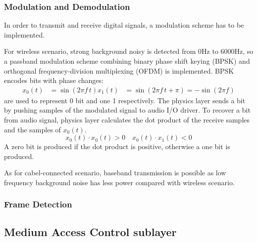 \subsubsection{Modulation and Demodulation}
In order to transmit and receive digital signals, a modulation scheme has to be implemented.
\par
For wireless scenario, strong background noisy is detected from 0Hz to 6000Hz,
so a passband modulation scheme
combining binary phase shift keying (BPSK) and orthogonal frequency-division multiplexing (OFDM)
is implemented.
BPSK encodes bits with phase changes:
\begin{align*}
	x_0(t) & =\sin(2\pi f\, t)
	x_1(t) & =\sin(2\pi f\, t + \pi) = -\sin(2\pi f)
\end{align*}
are used to represent 0 bit and one 1 respectively.
The physics layer sends a bit by pushing samples of the modulated signal to audio I/O driver.
To recover a bit from audio signal, physics layer calculates the dot product of the receive samples and the samples of $x_0(t)$.
\[
	x_0(t)\cdot x_0(t) > 0
	\quad
	x_0(t)\cdot x_1(t) < 0
\]
A zero bit is produced if the dot product is positive, otherwise a one bit is produced.

As for cabel-connected scenario, baseband transmission is possible as low frequency background noise has less power compared with wireless scenario.



\subsubsection{Frame Detection}

\subsection{Medium Access Control sublayer}
